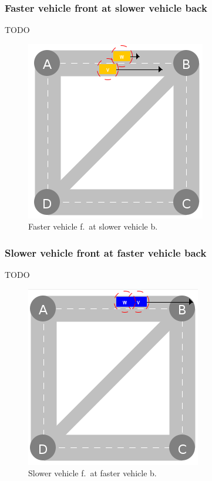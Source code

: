 \documentclass{IEEEtran}
\begin{document}
    \subsubsection{Faster vehicle front at slower vehicle back}
    TODO

    \begin{figure}[htbp]
        \centering
        \includegraphics[scale=0.5]{../../events/faster-vehicle-front-at-slower-vehicle-back.png}
        \caption{Faster vehicle f.\ at slower vehicle b.}
        \label{fig:faster-vehicle-front-at-slower-vehicle-back}
    \end{figure}

    \subsubsection{Slower vehicle front at faster vehicle back}
    TODO

    \begin{figure}[htbp]
        \centering
        \includegraphics[scale=0.5]{../../events/slower-vehicle-front-at-faster-vehicle-back.png}
        \caption{Slower vehicle f.\ at faster vehicle b.}
        \label{fig:slower-vehicle-front-at-faster-vehicle-back}
    \end{figure}
\end{document}
